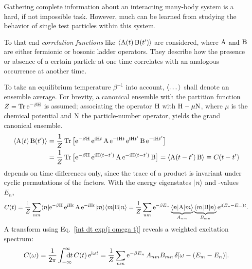 Gathering complete information about an interacting many-body system is a hard,
if not impossible task. However, much can be learned from studying the behavior
of single test particles within this system.

To that end \emph{correlation functions} like $\langle\mathrm A(t) \, \mathrm B(t')\rangle$ are
considered, where $\mathrm A$ and $\mathrm B$ are either fermionic or bosonic ladder
operators. They describe how the presence or absence of a certain particle at
one time correlates with an analogous occurrence at another time.

To take an equilibrium temperature $\beta^{-1}$ into account, $\langle\dots\rangle$ shall
denote an ensemble average. For brevity, a canonical ensemble with the partition
function $Z = \operatorname{Tr} \mathrm e^{-\beta \mathrm H}$ is assumed; associating the 
operator $\mathrm H$ with $\mathrm H - \mu \mathrm N$, where $\mu$ is the chemical potential
and $\mathrm N$ the particle-number operator, yields the grand canonical ensemble.
%
\begin{equation} \label{C(t)}
    \begin{split}
        \langle\mathrm A(t) \, \mathrm B(t')\rangle &= \frac 1 Z \operatorname{Tr}
        \big[
            \mathrm e^{-\beta \mathrm H} \,
            \mathrm e^{\mathrm i \mathrm H t} \, \mathrm A \, \mathrm e^{-\mathrm i \mathrm H t} \,
            \mathrm e^{\mathrm i \mathrm H t'} \, \mathrm B \, \mathrm e^{-\mathrm i \mathrm H t'}
        \big]
        \\
        &= \frac 1 Z \operatorname{Tr}
        \big[
            \mathrm e^{-\beta \mathrm H} \,
            \mathrm e^{\mathrm i \mathrm H (t - t')} \, \mathrm A \, \mathrm e^{-\mathrm i \mathrm H (t - t')} \, \mathrm B
        \big]
        = \langle\mathrm A(t - t') \, \mathrm B\rangle \equiv C(t - t')
    \end{split}
\end{equation}
%
depends on time differences only, since the trace of a product is invariant
under cyclic permutations of the factors. With the energy eigenstates $|n\rangle$
and -values $E_n$,
%
\begin{equation} \label{C(t) in energy basis}
    C(t) = \frac 1 Z \sum_{n m} \langle n|
    \mathrm e^{-\beta \mathrm H} \, \mathrm e^{\mathrm i \mathrm H t} \, \mathrm A \, \mathrm e^{-\mathrm i \mathrm H t}
    |m\rangle \langle m| \mathrm B |n\rangle =
    \frac 1 Z \sum_{n m} \mathrm e^{-\beta E_n}
    \underbrace{\langle n| \mathrm A |m\rangle}_{A_{n m}}
    \underbrace{\langle m| \mathrm B |n\rangle}_{B_{m n}}
    \mathrm e^{\mathrm i (E_n - E_m) t}.
\end{equation}
%
A  transform using Eq.~\ref{int dt exp(i omega t)} reveals a
weighted excitation spectrum:
%
\begin{equation} \label{C(omega)}
    C(\omega) = \frac 1 {2 \pi} \int \from{-\infty} \till \infty \D t \,
    C(t) \, \E^{\I \omega t} =
    \frac 1 Z \sum_{n m} \E^{-\beta E_n} \, A_{n m} B_{m n} \,
    \delta[\omega - (E_m - E_n)].
\end{equation}

